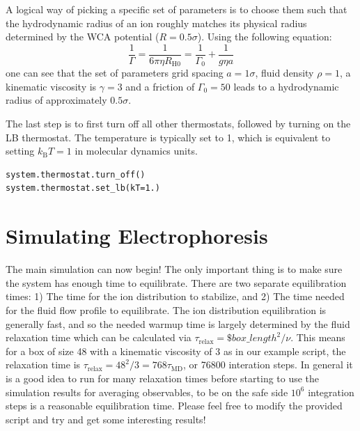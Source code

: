 \documentclass[
paper=a4,                       %
fontsize=11pt,                  %
twoside,                        %
footsepline,                    %
headsepline,                    %
headinclude=false,              %
footinclude=false,              %
pagesize,                       %
]{scrartcl}
\begin{document}
A logical way of picking a specific set of parameters is to choose them such that the hydrodynamic radius of an ion roughly matches its physical radius determined by the
WCA potential ($R=0.5\sigma$). Using the following equation:
\begin{equation}
\frac{1}{\Gamma}=\frac{1}{6\pi \eta R_{\mathrm{H0}}}=\frac{1}{\Gamma_0} 
+\frac{1}{g\eta a} 
 \label{effectiveGammaEq}
\end{equation}
one can see that the set of parameters grid spacing $a=1\sigma$, fluid density $\rho=1$, a 
kinematic viscosity is $\gamma=3 $ and a friction of $\Gamma_0=50$ leads to a hydrodynamic radius
of approximately $0.5\sigma$.

The last step is to first turn off all other thermostats, followed by turning on the LB thermostat. The temperature is typically set to 1, which is equivalent to setting
$k_\mathrm{B}T=1$ in molecular dynamics units.

{\small\vspace{0,2cm}
\begin{lstlisting}[numbers=none]
system.thermostat.turn_off()
system.thermostat.set_lb(kT=1.)
\end{lstlisting}
}

\section{Simulating Electrophoresis}
The main simulation can now begin! The only important thing is to make sure the system has enough time to equilibrate. There are two separate equilibration times: 1) The time for the ion distribution to stabilize, and 2) The time
needed for the fluid flow profile to equilibrate. The ion distribution equilibration is generally fast, and so the needed warmup time is largely determined by the fluid relaxation time which can be calculated via $\tau_\mathrm{relax} = \$box\_length^2/\nu$. This means for a box of size 48 with a kinematic viscosity of 3 as in our example script, the relaxation time is $\tau_\mathrm{relax} = 48^2/3 = 768 \tau_\mathrm{MD}$, or 76800 interation steps. In general it is a good idea to run for many relaxation times before starting to use the simulation results for averaging observables, to be on the safe side $10^6$ integration steps is a reasonable equilibration time. Please feel free to modify the provided script and try and get some interesting results!
\end{document}
